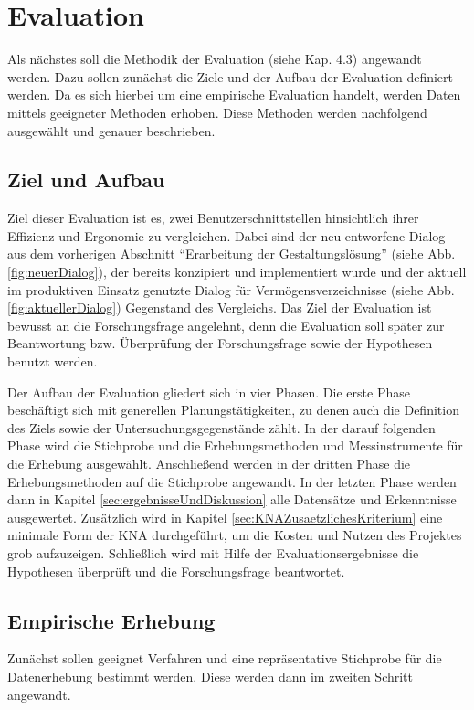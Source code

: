 \section{Evaluation}
Als nächstes soll die Methodik der Evaluation (siehe Kap. 4.3) angewandt werden. Dazu sollen zunächst die Ziele und der Aufbau der Evaluation definiert werden. Da es sich hierbei um eine empirische Evaluation handelt, werden Daten mittels geeigneter Methoden erhoben. Diese Methoden werden nachfolgend ausgewählt und genauer beschrieben.


\subsection{Ziel und Aufbau}
Ziel dieser Evaluation ist es, zwei Benutzerschnittstellen hinsichtlich ihrer Effizienz und Ergonomie zu vergleichen. Dabei sind der neu entworfene Dialog aus dem vorherigen Abschnitt \enquote{Erarbeitung der Gestaltungslösung} (siehe Abb. \ref{fig:neuerDialog}), der bereits konzipiert und implementiert wurde und der aktuell im produktiven Einsatz genutzte Dialog für Vermögensverzeichnisse (siehe Abb. \ref{fig:aktuellerDialog}) Gegenstand des Vergleichs. Das Ziel der Evaluation ist bewusst an die Forschungsfrage angelehnt, denn die Evaluation soll später zur Beantwortung bzw. Überprüfung der Forschungsfrage sowie der Hypothesen benutzt werden.

Der Aufbau der Evaluation gliedert sich in vier Phasen. Die erste Phase beschäftigt sich mit generellen Planungstätigkeiten, zu denen auch die Definition des Ziels sowie der Untersuchungsgegenstände zählt. In der darauf folgenden Phase wird die Stichprobe und die Erhebungsmethoden und Messinstrumente für die Erhebung ausgewählt. Anschließend werden in der dritten Phase die Erhebungsmethoden auf die Stichprobe angewandt. In der letzten Phase werden dann in Kapitel \ref{sec:ergebnisseUndDiskussion} alle Datensätze und Erkenntnisse ausgewertet. Zusätzlich wird in Kapitel \ref{sec:KNAZusaetzlichesKriterium} eine minimale Form der \gls{KNA} durchgeführt, um die Kosten und Nutzen des Projektes grob aufzuzeigen. Schließlich wird mit Hilfe der Evaluationsergebnisse die Hypothesen überprüft und die Forschungsfrage beantwortet.


\subsection{Empirische Erhebung}
\label{sec:empirischeErhebung}
Zunächst sollen geeignet Verfahren und eine repräsentative Stichprobe für die Datenerhebung bestimmt werden. Diese werden dann im zweiten Schritt angewandt.

